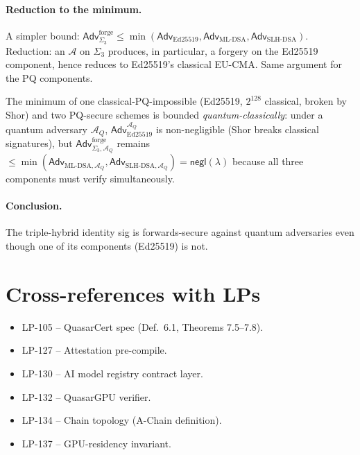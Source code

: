 \documentclass[11pt]{article}
\begin{document}
\paragraph{Reduction to the minimum.}
A simpler bound: $\mathsf{Adv}^{\mathrm{forge}}_{\Sigma_3} \leq
\min(\mathsf{Adv}_{\mathrm{Ed25519}},
     \mathsf{Adv}_{\mathrm{ML\text{-}DSA}},
     \mathsf{Adv}_{\mathrm{SLH\text{-}DSA}})$. Reduction: an
$\mathcal{A}$ on $\Sigma_3$ produces, in particular, a forgery on
the Ed25519 component, hence reduces to Ed25519's classical
EU-CMA. Same argument for the PQ components.

The minimum of one classical-PQ-impossible (Ed25519, $2^{128}$
classical, broken by Shor) and two PQ-secure schemes is bounded
\emph{quantum-classically}: under a quantum adversary $\mathcal{A}_Q$,
$\mathsf{Adv}_{\mathrm{Ed25519}}^{\mathcal{A}_Q}$ is non-negligible
(Shor breaks classical signatures), but
$\mathsf{Adv}^{\mathrm{forge}}_{\Sigma_3,\mathcal{A}_Q}$ remains
$\leq \min(\mathsf{Adv}_{\mathrm{ML\text{-}DSA},\mathcal{A}_Q},
        \mathsf{Adv}_{\mathrm{SLH\text{-}DSA},\mathcal{A}_Q})
= \mathsf{negl}(\lambda)$ because all three components must verify
simultaneously.

\paragraph{Conclusion.} The triple-hybrid identity sig is
forwards-secure against quantum adversaries even though one of
its components (Ed25519) is not.

\section{Cross-references with LPs}
\label{sec:lp-refs}

\begin{itemize}[nosep]
  \item LP-105 -- QuasarCert spec (Def.~6.1, Theorems 7.5--7.8).
  \item LP-127 -- Attestation pre-compile.
  \item LP-130 -- AI model registry contract layer.
  \item LP-132 -- QuasarGPU verifier.
  \item LP-134 -- Chain topology (A-Chain definition).
  \item LP-137 -- GPU-residency invariant.
\end{itemize}
\end{document}
